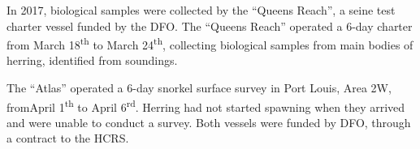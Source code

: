 In 2017, biological samples were collected by the ``Queens Reach'', a seine test charter vessel funded by the DFO.
The ``Queens Reach'' operated a 6-day charter from March 18\textsuperscript{th} to March 24\textsuperscript{th}, collecting biological samples from main bodies of herring, identified from soundings. 
 
The ``Atlas'' operated a 6-day snorkel surface survey in Port Louis, Area 2W, fromApril 1\textsuperscript{th} to April 6\textsuperscript{rd}.
Herring had not started spawning when they arrived and were unable to conduct a survey.
Both vessels were funded by DFO, through a contract to the HCRS.